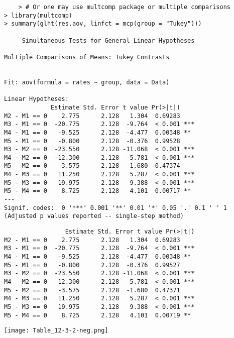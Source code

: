 \begin{frame}[fragile]
	\begin{center}
		\begin{minipage}{0.7\textwidth}
	\begin{lstlisting}
	> # Or one may use multcomp package or multiple comparisons
> library(multcomp)
> summary(glht(res.aov, linfct = mcp(group = "Tukey")))

	 Simultaneous Tests for General Linear Hypotheses

Multiple Comparisons of Means: Tukey Contrasts


Fit: aov(formula = rates ~ group, data = Data)

Linear Hypotheses:
             Estimate Std. Error t value Pr(>|t|)
M2 - M1 == 0    2.775      2.128   1.304  0.69283
M3 - M1 == 0  -20.775      2.128  -9.764  < 0.001 ***
M4 - M1 == 0   -9.525      2.128  -4.477  0.00348 **
M5 - M1 == 0   -0.800      2.128  -0.376  0.99528
M3 - M2 == 0  -23.550      2.128 -11.068  < 0.001 ***
M4 - M2 == 0  -12.300      2.128  -5.781  < 0.001 ***
M5 - M2 == 0   -3.575      2.128  -1.680  0.47374
M4 - M3 == 0   11.250      2.128   5.287  < 0.001 ***
M5 - M3 == 0   19.975      2.128   9.388  < 0.001 ***
M5 - M4 == 0    8.725      2.128   4.101  0.00717 **
---
Signif. codes:  0 '***' 0.001 '**' 0.01 '*' 0.05 '.' 0.1 ' ' 1
(Adjusted p values reported -- single-step method)
	\end{lstlisting}
		\end{minipage}
	\end{center}
\end{frame}
\begin{frame}[fragile]
	\begin{center}
		\begin{minipage}{0.7\textwidth}
	\begin{lstlisting}
	             Estimate Std. Error t value Pr(>|t|)
M2 - M1 == 0    2.775      2.128   1.304  0.69283
M3 - M1 == 0  -20.775      2.128  -9.764  < 0.001 ***
M4 - M1 == 0   -9.525      2.128  -4.477  0.00348 **
M5 - M1 == 0   -0.800      2.128  -0.376  0.99527
M3 - M2 == 0  -23.550      2.128 -11.068  < 0.001 ***
M4 - M2 == 0  -12.300      2.128  -5.781  < 0.001 ***
M5 - M2 == 0   -3.575      2.128  -1.680  0.47371
M4 - M3 == 0   11.250      2.128   5.287  < 0.001 ***
M5 - M3 == 0   19.975      2.128   9.388  < 0.001 ***
M5 - M4 == 0    8.725      2.128   4.101  0.00719 **
	\end{lstlisting}
		\end{minipage}
		\texttt{[image: Table\_12-3-2-neg.png]}
	\end{center}
\end{frame}
